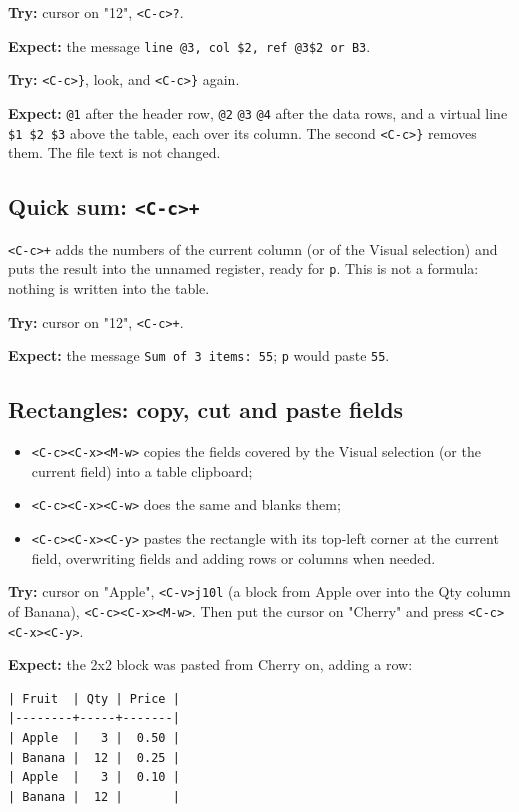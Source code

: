 \textbf{Try:} cursor on "12", \texttt{<C-c>?}.

\textbf{Expect:} the message \texttt{line @3, col \$2, ref @3\$2 or B3}.

\textbf{Try:} \texttt{<C-c>\}}, look, and \texttt{<C-c>\}} again.

\textbf{Expect:} \texttt{@1} after the header row, \texttt{@2} \texttt{@3} \texttt{@4} after the data rows,
and a virtual line \texttt{\$1 \$2 \$3} above the table, each over its column. The
second \texttt{<C-c>\}} removes them. The file text is not changed.
\subsection{Quick sum: \texttt{<C-c>+}}
\label{sec:org85dfe2e}
\texttt{<C-c>+} adds the numbers of the current column (or of the Visual
selection) and puts the result into the unnamed register, ready for \texttt{p}.
This is not a formula: nothing is written into the table.

\textbf{Try:} cursor on "12", \texttt{<C-c>+}.

\textbf{Expect:} the message \texttt{Sum of 3 items: 55}; \texttt{p} would paste \texttt{55}.
\subsection{Rectangles: copy, cut and paste fields}
\label{sec:orgb2d4fbd}
\begin{itemize}
\item \texttt{<C-c><C-x><M-w>} copies the fields covered by the Visual selection (or
the current field) into a table clipboard;
\item \texttt{<C-c><C-x><C-w>} does the same and blanks them;
\item \texttt{<C-c><C-x><C-y>} pastes the rectangle with its top-left corner at the
current field, overwriting fields and adding rows or columns when needed.
\end{itemize}

\textbf{Try:} cursor on "Apple", \texttt{<C-v>j10l} (a block from Apple over into the Qty
column of Banana), \texttt{<C-c><C-x><M-w>}. Then put the cursor on "Cherry" and
press \texttt{<C-c><C-x><C-y>}.

\textbf{Expect:} the 2x2 block was pasted from Cherry on, adding a row:
\begin{verbatim}
| Fruit  | Qty | Price |
|--------+-----+-------|
| Apple  |   3 |  0.50 |
| Banana |  12 |  0.25 |
| Apple  |   3 |  0.10 |
| Banana |  12 |       |
\end{verbatim}

